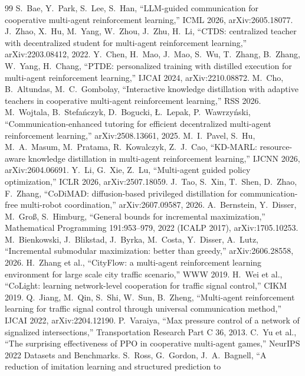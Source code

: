 \documentclass[11pt]{article}
\theoremstyle{definition}
\begin{document}
\begin{thebibliography}{99}
 S.~Bae, Y.~Park, S.~Lee, S.~Han, ``LLM-guided communication for cooperative multi-agent reinforcement
learning,'' ICML 2026, arXiv:2605.18077.
 J.~Zhao, X.~Hu, M.~Yang, W.~Zhou, J.~Zhu, H.~Li, ``CTDS: centralized teacher with decentralized student
for multi-agent reinforcement learning,'' arXiv:2203.08412, 2022.
 Y.~Chen, H.~Mao, J.~Mao, S.~Wu, T.~Zhang, B.~Zhang, W.~Yang, H.~Chang, ``PTDE: personalized training with
distilled execution for multi-agent reinforcement learning,'' IJCAI 2024, arXiv:2210.08872.
 M.~Cho, B.~Altundas, M.~C.~Gombolay, ``Interactive knowledge distillation with adaptive teachers in
cooperative multi-agent reinforcement learning,'' RSS 2026.
 M.~Wojtala, B.~Stefa\'nczyk, D.~Bogucki, \L.~Lepak, P.~Wawrzy\'nski, ``Communication-enhanced tutoring
for efficient decentralized multi-agent reinforcement learning,'' arXiv:2508.13661, 2025.
 M.~I.~Pavel, S.~Hu, M.~A.~Masum, M.~Pratama, R.~Kowalczyk, Z.~J.~Cao, ``KD-MARL: resource-aware knowledge
distillation in multi-agent reinforcement learning,'' IJCNN 2026, arXiv:2604.06691.
 Y.~Li, G.~Xie, Z.~Lu, ``Multi-agent guided policy optimization,'' ICLR 2026, arXiv:2507.18059.
 J.~Tao, S.~Xin, T.~Shen, D.~Zhao, F.~Zhang, ``CoDiMAD: diffusion-based privileged distillation for
communication-free multi-robot coordination,'' arXiv:2607.09587, 2026.
 A.~Bernstein, Y.~Disser, M.~Gro{\ss}, S.~Himburg, ``General bounds for incremental
maximization,'' Mathematical Programming 191:953--979, 2022 (ICALP 2017), arXiv:1705.10253.
 M.~Bienkowski, J.~Blikstad, J.~Byrka, M.~Costa, Y.~Disser, A.~Lutz, ``Incremental submodular
maximization: better than greedy,'' arXiv:2606.28558, 2026.
 H.~Zhang et al., ``CityFlow: a multi-agent reinforcement learning environment for large scale city
traffic scenario,'' WWW 2019.
 H.~Wei et al., ``CoLight: learning network-level cooperation for traffic signal control,'' CIKM 2019.
 Q.~Jiang, M.~Qin, S.~Shi, W.~Sun, B.~Zheng, ``Multi-agent reinforcement learning for traffic signal
control through universal communication method,'' IJCAI 2022, arXiv:2204.12190.
 P.~Varaiya, ``Max pressure control of a network of signalized intersections,'' Transportation
Research Part C 36, 2013.
 C.~Yu et al., ``The surprising effectiveness of PPO in cooperative multi-agent games,'' NeurIPS 2022
Datasets and Benchmarks.
 S.~Ross, G.~Gordon, J.~A.~Bagnell, ``A reduction of imitation learning and structured prediction to

\end{thebibliography}
\end{document}
